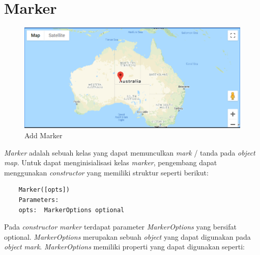 \section{Marker}
\label{sec:mark}
  \begin{figure}[H]
    \centering
    \includegraphics[scale=0.5]{Gambar/add_marker.PNG}
    \caption{Add Marker}
    \label{fig:my_label}
\end{figure}

\textit{Marker} adalah sebuah kelas yang dapat memunculkan \textit{mark} / tanda pada \textit{object} \textit{map}. Untuk dapat menginisialisasi kelas \textit{marker}, pengembang dapat menggunakan \textit{constructor} yang memiliki struktur seperti berikut:
\begin{lstlisting}
    Marker([opts])
    Parameters: 
    opts:  MarkerOptions optional
\end{lstlisting}
Pada \textit{constructor} \textit{marker} terdapat parameter \textit{MarkerOptions} yang bersifat optional. \textit{MarkerOptions} merupakan sebuah \textit{object} yang dapat digunakan pada \textit{object} \textit{mark}. \textit{MarkerOptions} memiliki properti yang dapat digunakan  seperti:

